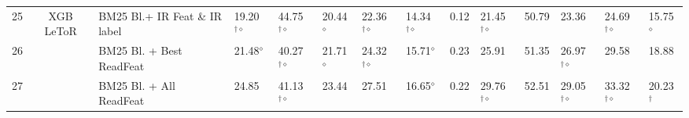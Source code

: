 \begin{table}
{\begin{tabular}{ccllllllllllll}
\midrule 
25 & \multirow{3}{*}{XGB LeToR} & BM25 Bl.+ IR Feat \& IR label  & 19.20$^{\dagger\diamond}$ & 44.75$^{\dagger\diamond}$ & 20.44$^{\diamond}$  & 22.36$^{\dagger\diamond}$ & 14.34$^{\dagger\diamond}$ & 0.12 & 21.45$^{\dagger\diamond}$ & 50.79  & 23.36 & 24.69$^{\dagger\diamond}$ & 15.75$^{\diamond}$\tabularnewline
26  &  & BM25 Bl. + Best ReadFeat  & 21.48$^{\diamond}$  & 40.27$^{\dagger\diamond}$ & 21.71$^{\diamond}$  & 24.32$^{\dagger\diamond}$ & 15.71$^{\diamond}$  & 0.23 & 25.91  & 51.35  & 26.97$^{\dagger\diamond}$ & 29.58  & 18.88 \tabularnewline
27  &  & BM25 Bl. + All ReadFeat  & 24.85  & 41.13$^{\dagger\diamond}$ & 23.44  & 27.51  & 16.65$^{\diamond}$  & 0.22 & 29.76$^{\dagger\diamond}$ & 52.51  & 29.05$^{\dagger\diamond}$ & 33.32$^{\dagger\diamond}$ & 20.23$^{\dagger}$ \tabularnewline
\bottomrule
\end{tabular}} %
\end{table}
